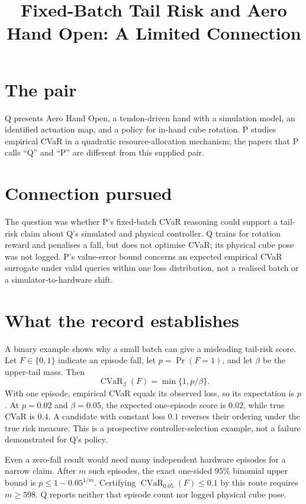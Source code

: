 \documentclass{article}
\title{Fixed-Batch Tail Risk and Aero Hand Open: A Limited Connection}
\begin{document}
\maketitle

\section*{The pair}

Q presents Aero Hand Open, a tendon-driven hand with a simulation model, an identified actuation map, and a policy for in-hand cube rotation. P studies empirical CVaR in a quadratic resource-allocation mechanism; the papers that P calls ``Q'' and ``P'' are different from this supplied pair. 

\section*{Connection pursued}

The question was whether P's fixed-batch CVaR reasoning could support a tail-risk claim about Q's simulated and physical controller. Q trains for rotation reward and penalises a fall, but does not optimise CVaR; its physical cube pose was not logged. P's value-error bound concerns an expected empirical CVaR surrogate under valid queries within one loss distribution, not a realised batch or a simulator-to-hardware shift. 

\section*{What the record establishes}

A binary example shows why a small batch can give a misleading tail-risk score. Let \(F\in\{0,1\}\) indicate an episode fall, let \(p=\Pr(F=1)\), and let \(\beta\) be the upper-tail mass. Then
\[
\operatorname{CVaR}_{\beta}(F)=\min\{1,p/\beta\}.
\]
With one episode, empirical CVaR equals its observed loss, so its expectation is \(p\). At \(p=0.02\) and \(\beta=0.05\), the expected one-episode score is \(0.02\), while true CVaR is \(0.4\). A candidate with constant loss \(0.1\) reverses their ordering under the true risk measure. This is a prospective controller-selection example, not a failure demonstrated for Q's policy. 

Even a zero-fall result would need many independent hardware episodes for a narrow claim. After \(m\) such episodes, the exact one-sided \(95\%\) binomial upper bound is \(p\leq 1-0.05^{1/m}\). Certifying \(\operatorname{CVaR}_{0.05}(F)\leq0.1\) by this route requires \(m\geq598\). Q reports neither that episode count nor logged physical cube pose. 
\end{document}
